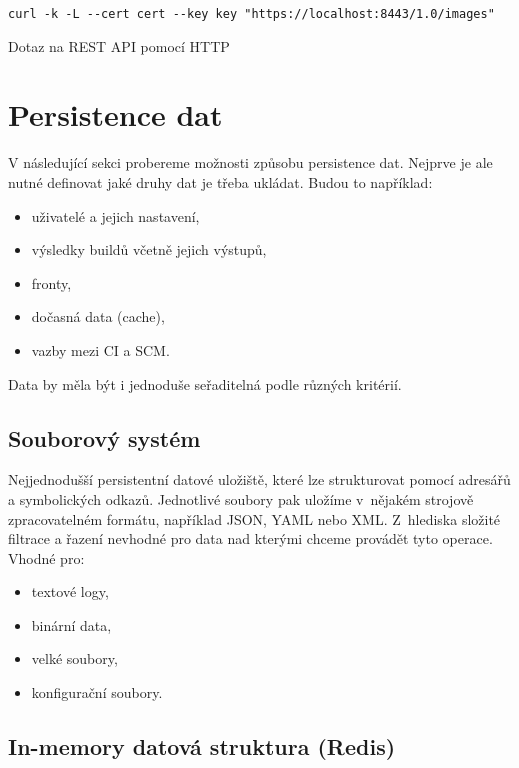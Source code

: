 \begin{listing}[ht]
\begin{verbatim}
curl -k -L --cert cert --key key "https://localhost:8443/1.0/images"
\end{verbatim}
\caption{Dotaz na REST API pomocí HTTP}
\end{listing}

\section{Persistence dat}

V následující sekci probereme možnosti způsobu persistence dat.
Nejprve je ale nutné definovat jaké druhy dat je třeba ukládat.
Budou to například:

\begin{itemize}
	\item uživatelé a jejich nastavení,
	\item výsledky buildů včetně jejich výstupů,
	\item fronty,
	\item dočasná data (cache),
	\item vazby mezi CI a SCM.
\end{itemize}

Data by měla být i jednoduše seřaditelná podle různých kritérií.

\subsection{Souborový systém}

Nejjednodušší persistentní datové uložiště, které lze strukturovat pomocí adresářů a symbolických odkazů.
Jednotlivé soubory pak uložíme v~nějakém strojově zpracovatelném formátu, například JSON, YAML nebo XML.
Z~hlediska složité filtrace a řazení nevhodné pro data nad kterými chceme provádět tyto operace.
Vhodné pro:
\begin{itemize}
	\item textové logy,
	\item binární data,
	\item velké soubory,
	\item konfigurační soubory.
\end{itemize}

\subsection{In-memory datová struktura (Redis)}


